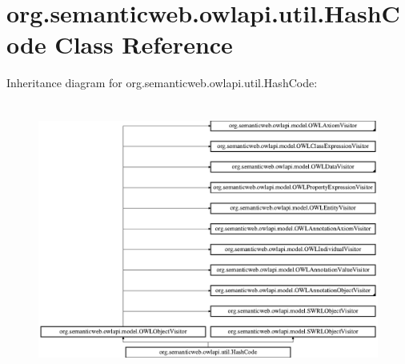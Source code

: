 \hypertarget{classorg_1_1semanticweb_1_1owlapi_1_1util_1_1_hash_code}{\section{org.\-semanticweb.\-owlapi.\-util.\-Hash\-Code Class Reference}
\label{classorg_1_1semanticweb_1_1owlapi_1_1util_1_1_hash_code}
}
Inheritance diagram for org.\-semanticweb.\-owlapi.\-util.\-Hash\-Code\-:\begin{figure}[H]
\begin{center}
\leavevmode
\includegraphics[height=9.056604cm]{classorg_1_1semanticweb_1_1owlapi_1_1util_1_1_hash_code}
\end{center}
\end{figure}
